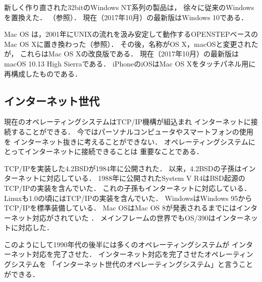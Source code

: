 \begin{enumerate}
\begin{itemize}
      新しく作り直された32bitのWindows NT系列の製品は，
      徐々に従来のWindowsを置換えた．
      （参照）．
      現在（2017年10月）の最新版はWindows 10である．

      Mac OS は，2001年にUNIXの流れを汲み安定して動作するOPENSTEPベースの
      Mac OS X\cite{macos}に置き換わった（参照）．
      その後，名称がOS X，macOSと変更されたが，
      これらはMac OS Xの改良版である．
      現在（2017年10月）の最新版はmacOS 10.13 High Sierraである．
      iPhoneのiOSはMac OS Xをタッチパネル用に再構成したものである\cite{ios}．
    \end{itemize}
\end{enumerate}

\subsection{インターネット世代}
現在のオペレーティングシステムはTCP/IP機構が組込まれ
インターネットに接続することができる．
今ではパーソナルコンピュータやスマートフォンの使用を
インターネット抜きに考えることができない．
オペレーティングシステムにとってインターネットに接続できることは
重要なことである．

TCP/IPを実装した4.2BSDが1984年に公開された\cite{bsd}．
以来，4.2BSDの子孫はインターネットに対応している．
1988年に公開されたSystem V R4はBSD起源のTCP/IPの実装を含んでいた\cite{svr4}．
これの子孫もインターネットに対応している．
Linuxも1.0の頃にはTCP/IPの実装を含んでいた\cite{linux1}．
WindowsはWindows 95からTCP/IPを標準装備している\cite{windows}．
Mac OSはMac OS 8が発表されるまでにはインターネット対応がされていた
\cite{classicmacos}．
メインフレームの世界でもOS/390はインターネットに対応した\cite{os390}．

このようにして1990年代の後半には多くのオペレーティングシステムが
インターネット対応を完了させた．
インターネット対応を完了させたオペレーティングシステムを
「インターネット世代のオペレーティングシステム」と言うことができる．

